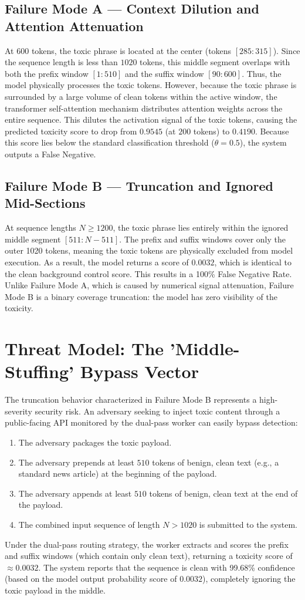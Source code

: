 \documentclass[10pt]{article}
\begin{document}
\subsection{Failure Mode A --- Context Dilution and Attention Attenuation}
At $600$ tokens, the toxic phrase is located at the center (tokens $[285:315]$). Since the sequence length is less than $1020$ tokens, this middle segment overlaps with both the prefix window $[1:510]$ and the suffix window $[90:600]$. Thus, the model physically processes the toxic tokens.
However, because the toxic phrase is surrounded by a large volume of clean tokens within the active window, the transformer self-attention mechanism distributes attention weights across the entire sequence. This dilutes the activation signal of the toxic tokens, causing the predicted toxicity score to drop from $0.9545$ (at $200$ tokens) to $0.4190$. Because this score lies below the standard classification threshold ($\theta = 0.5$), the system outputs a False Negative.

\subsection{Failure Mode B --- Truncation and Ignored Mid-Sections}
At sequence lengths $N \ge 1200$, the toxic phrase lies entirely within the ignored middle segment $[511 : N-511]$. The prefix and suffix windows cover only the outer 1020 tokens, meaning the toxic tokens are physically excluded from model execution. 
As a result, the model returns a score of $0.0032$, which is identical to the clean background control score. This results in a 100\% False Negative Rate. Unlike Failure Mode A, which is caused by numerical signal attenuation, Failure Mode B is a binary coverage truncation: the model has zero visibility of the toxicity.

\section{Threat Model: The 'Middle-Stuffing' Bypass Vector}
The truncation behavior characterized in Failure Mode B represents a high-severity security risk. An adversary seeking to inject toxic content through a public-facing API monitored by the dual-pass worker can easily bypass detection:
\begin{enumerate}
\item The adversary packages the toxic payload.
\item The adversary prepends at least $510$ tokens of benign, clean text (e.g., a standard news article) at the beginning of the payload.
\item The adversary appends at least $510$ tokens of benign, clean text at the end of the payload.
\item The combined input sequence of length $N > 1020$ is submitted to the system.
\end{enumerate}
Under the dual-pass routing strategy, the worker extracts and scores the prefix and suffix windows (which contain only clean text), returning a toxicity score of $\approx 0.0032$. The system reports that the sequence is clean with 99.68\% confidence (based on the model output probability score of $0.0032$), completely ignoring the toxic payload in the middle. 
\end{document}
